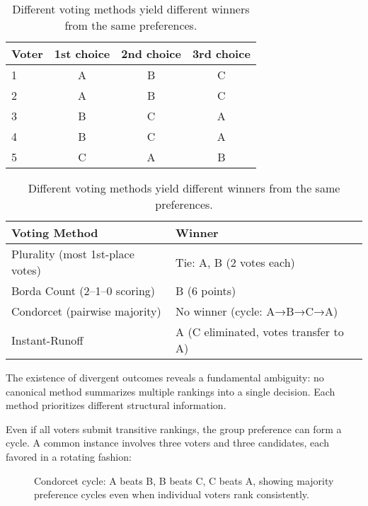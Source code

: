 \begin{table}[H]
\centering
\renewcommand{\arraystretch}{1.25}
\begin{tabular}{l|ccc}
\textbf{Voter} & \textbf{1st choice} & \textbf{2nd choice} & \textbf{3rd choice} \\
\hline
1 & A & B & C \\
2 & A & B & C \\
3 & B & C & A \\
4 & B & C & A \\
5 & C & A & B \\
\end{tabular}

\vspace{1em}

\begin{tabular}{l|l}
\textbf{Voting Method} & \textbf{Winner} \\
\hline
Plurality (most 1st-place votes) & Tie: A, B (2 votes each) \\
Borda Count (2–1–0 scoring) & B (6 points) \\
Condorcet (pairwise majority) & No winner (cycle: A→B→C→A) \\
Instant-Runoff & A (C eliminated, votes transfer to A) \\
\end{tabular}
\caption{Different voting methods yield different winners from the same preferences.}
\end{table}

The existence of divergent outcomes reveals a fundamental ambiguity: no canonical method summarizes multiple rankings into a single decision. Each method prioritizes different structural information.

Even if all voters submit transitive rankings, the group preference can form a cycle. A common instance involves three voters and three candidates, each favored in a rotating fashion:

\begin{figure}[H]
\centering
{}
\caption{Condorcet cycle: A beats B, B beats C, C beats A, showing majority preference cycles even when individual voters rank consistently.}
\end{figure}


